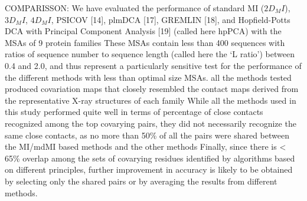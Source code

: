COMPARISSON: \cite{clark2014multidimensional}
	We have evaluated the performance of standard MI ($2D_MI$), $3D_MI$, $4D_MI$, PSICOV [14], plmDCA [17], GREMLIN [18], and Hopfield-Potts DCA with Principal Component Analysis [19] (called here hpPCA) with the MSAs of 9 protein families \cite{clark2014multidimensional}
	These MSAs contain less than 400 sequences with ratios of sequence number to sequence length (called here the `L ratio') between 0.4 and 2.0, and thus represent a particularly sensitive test for the performance of the different methods with less than optimal size MSAs.  \cite{clark2014multidimensional}
	all the methods tested produced covariation maps that closely resembled the contact maps derived from the representative X-ray structures of each family \cite{clark2014multidimensional}
	While all the methods used in this study performed quite well in terms of percentage of close contacts recognized among the top covarying pairs, they did not necessarily recognize the same close contacts, as no more than 50\% of all the pairs were shared between the MI/mdMI based methods and the other methods \cite{clark2014multidimensional}
	Finally, since there is < 65\% overlap among the sets of covarying residues identified by algorithms based on different principles, further improvement in accuracy is likely to be obtained by selecting only the shared pairs or by averaging the results from different methods. \cite{clark2014multidimensional}


